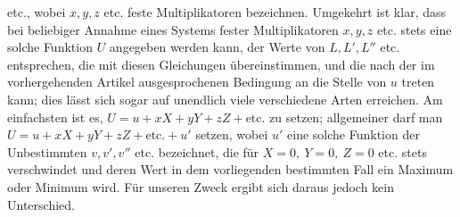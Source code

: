 etc., wobei \(x,y,z\) etc. feste Multiplikatoren bezeichnen. Umgekehrt ist klar, dass bei beliebiger Annahme eines Systems fester Multiplikatoren \(x,y,z\) etc. stets eine solche Funktion \(U\) angegeben werden kann, der Werte von \(L,L',L''\) etc. entsprechen, die mit diesen Gleichungen übereinstimmen, und die nach der im vorhergehenden Artikel ausgesprochenen Bedingung an die Stelle von \(u\) treten kann; dies lässt sich sogar auf unendlich viele verschiedene Arten erreichen. Am einfachsten ist es, \(U=u+xX+yY+zZ+\text{etc.}\) zu setzen; allgemeiner darf man \(U=u+xX+yY+zZ+\text{etc.}+u'\) setzen, wobei \(u'\) eine solche Funktion der Unbestimmten \(v,v',v''\) etc. bezeichnet, die für \(X=0,\ Y=0,\ Z=0\) etc. stets verschwindet und deren Wert in dem vorliegenden bestimmten Fall ein Maximum oder Minimum wird. Für unseren Zweck ergibt sich daraus jedoch kein Unterschied.

\clearpage
